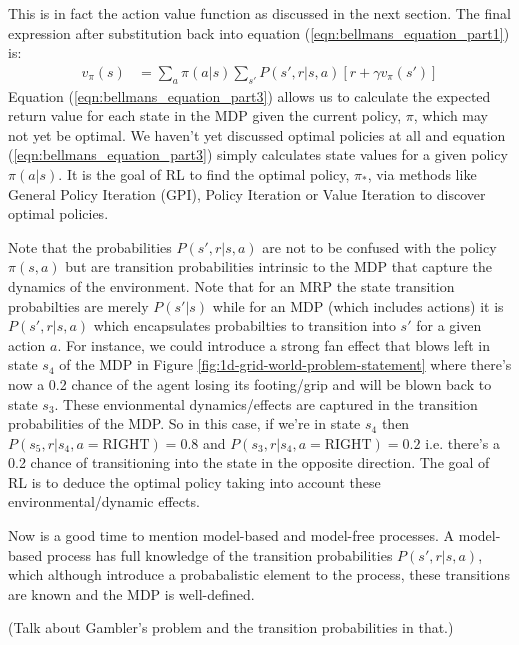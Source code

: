 \documentclass[a4paper,11pt]{article}
\begin{document}
This is in fact the action value function as discussed in the next section.  The final expression after substitution back into equation (\ref{eqn:bellmans_equation_part1}) is:
\begin{equation} \label{eqn:bellmans_equation_part3}
\begin{split}
        v_\pi (s) &= \sum_{a} \pi(a|s) \sum_{s'} P(s',r|s,a) [r + \gamma v_{\pi}(s')]
\end{split}
\end{equation}
Equation (\ref{eqn:bellmans_equation_part3}) allows us to calculate the expected return value for each state in the MDP given the current policy, $\pi$, which may not yet be optimal.  We haven't yet discussed optimal policies at all and equation (\ref{eqn:bellmans_equation_part3}) simply calculates state values for a given policy $\pi(a|s)$.  It is the goal of RL to find the optimal policy, $\pi_*$, via methods like General Policy Iteration (GPI), Policy Iteration or Value Iteration to discover optimal policies.

Note that the probabilities $P(s',r|s,a)$ are not to be confused with the policy $\pi(s,a)$ but are transition probabilities intrinsic to the MDP that capture the dynamics of the environment.  Note that for an MRP the state transition probabilties are merely $P(s'|s)$ while for an MDP (which includes actions) it is $P(s',r|s,a)$ which encapsulates probabilties to transition into $s'$ for a given action $a$.  For instance, we could introduce a strong fan effect that blows left in state $s_4$ of the MDP in Figure \ref{fig:1d-grid-world-problem-statement} where there's now a 0.2 chance of the agent losing its footing/grip and will be blown back to state $s_3$.  These envionmental dynamics/effects are captured in the transition probabilities of the MDP.  So in this case, if we're in state $s_4$ then $P(s_5,r|s_4, a=\text{RIGHT}) = 0.8$ and $P(s_3,r|s_4, a=\text{RIGHT}) = 0.2$ i.e. there's a 0.2 chance of transitioning into the state in the opposite direction.  The goal of RL is to deduce the optimal policy taking into account these environmental/dynamic effects.

Now is a good time to mention model-based and model-free processes.  A model-based process has full knowledge of the transition probabilities $P(s',r|s,a)$, which although introduce a probabalistic element to the process, these transitions are known and the MDP is well-defined.  

(Talk about Gambler's problem and the transition probabilities in that.)
\end{document}
